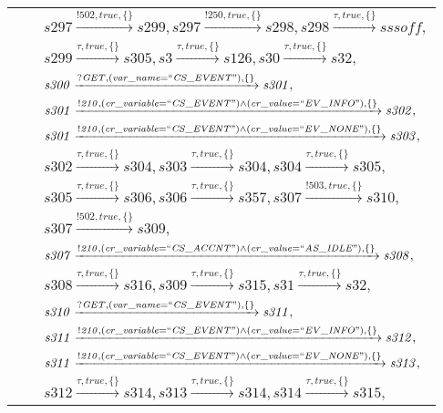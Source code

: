 \begin{tabular}{lcl}
& & $\mathit{s297}\xrightarrow{\mathit{!502}, \mathit{true}, \{\}}\mathit{s299},\mathit{s297}\xrightarrow{\mathit{!250}, \mathit{true}, \{\}}\mathit{s298},\mathit{s298}\xrightarrow{\mathit{\tau}, \mathit{true}, \{\}}\mathit{sssoff},$ \\
& & $\mathit{s299}\xrightarrow{\mathit{\tau}, \mathit{true}, \{\}}\mathit{s305},\mathit{s3}\xrightarrow{\mathit{\tau}, \mathit{true}, \{\}}\mathit{s126},\mathit{s30}\xrightarrow{\mathit{\tau}, \mathit{true}, \{\}}\mathit{s32},$ \\
& & $\mathit{s300}\xrightarrow{\mathit{?GET}, \mathit{(var\_name = ``CS\_EVENT")}, \{\}}\mathit{s301},$ \\
& & $\mathit{s301}\xrightarrow{\mathit{!210}, \mathit{(cr\_variable = ``CS\_EVENT") \land (cr\_value = ``EV\_INFO")}, \{\}}\mathit{s302},$ \\
& & $\mathit{s301}\xrightarrow{\mathit{!210}, \mathit{(cr\_variable = ``CS\_EVENT") \land (cr\_value = ``EV\_NONE")}, \{\}}\mathit{s303},$ \\
& & $\mathit{s302}\xrightarrow{\mathit{\tau}, \mathit{true}, \{\}}\mathit{s304},\mathit{s303}\xrightarrow{\mathit{\tau}, \mathit{true}, \{\}}\mathit{s304},\mathit{s304}\xrightarrow{\mathit{\tau}, \mathit{true}, \{\}}\mathit{s305},$ \\
& & $\mathit{s305}\xrightarrow{\mathit{\tau}, \mathit{true}, \{\}}\mathit{s306},\mathit{s306}\xrightarrow{\mathit{\tau}, \mathit{true}, \{\}}\mathit{s357},\mathit{s307}\xrightarrow{\mathit{!503}, \mathit{true}, \{\}}\mathit{s310},$ \\
& & $\mathit{s307}\xrightarrow{\mathit{!502}, \mathit{true}, \{\}}\mathit{s309},$ \\
& & $\mathit{s307}\xrightarrow{\mathit{!210}, \mathit{(cr\_variable = ``CS\_ACCNT") \land (cr\_value = ``AS\_IDLE")}, \{\}}\mathit{s308},$ \\
& & $\mathit{s308}\xrightarrow{\mathit{\tau}, \mathit{true}, \{\}}\mathit{s316},\mathit{s309}\xrightarrow{\mathit{\tau}, \mathit{true}, \{\}}\mathit{s315},\mathit{s31}\xrightarrow{\mathit{\tau}, \mathit{true}, \{\}}\mathit{s32},$ \\
& & $\mathit{s310}\xrightarrow{\mathit{?GET}, \mathit{(var\_name = ``CS\_EVENT")}, \{\}}\mathit{s311},$ \\
& & $\mathit{s311}\xrightarrow{\mathit{!210}, \mathit{(cr\_variable = ``CS\_EVENT") \land (cr\_value = ``EV\_INFO")}, \{\}}\mathit{s312},$ \\
& & $\mathit{s311}\xrightarrow{\mathit{!210}, \mathit{(cr\_variable = ``CS\_EVENT") \land (cr\_value = ``EV\_NONE")}, \{\}}\mathit{s313},$ \\
& & $\mathit{s312}\xrightarrow{\mathit{\tau}, \mathit{true}, \{\}}\mathit{s314},\mathit{s313}\xrightarrow{\mathit{\tau}, \mathit{true}, \{\}}\mathit{s314},\mathit{s314}\xrightarrow{\mathit{\tau}, \mathit{true}, \{\}}\mathit{s315},$ \\
\end{tabular}

